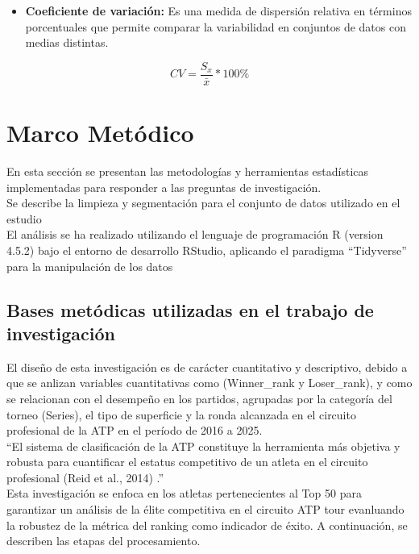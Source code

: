 \documentclass[oneside,11pt]{Latex/Classes/PhDthesisPSnPDF}
\begin{document}
\begin{itemize}
 \item \textbf{ Coeficiente de variación:} Es una medida de dispersión relativa en términos porcentuales que permite comparar la variabilidad en conjuntos de datos con medias distintas. 
\end{itemize}

\[CV=\frac{S_x} {\bar{x}}*100\% \]

\chapter{Marco Metódico}

En esta sección se presentan las metodologías y herramientas
estadísticas implementadas para responder a las preguntas de
investigación.\\

Se describe la limpieza y segmentación para el conjunto de datos
utilizado en el estudio\\

El análisis se ha realizado utilizando el lenguaje de programación R
(version 4.5.2) bajo el entorno de desarrollo RStudio, aplicando el
paradigma ``Tidyverse'' para la manipulación de los datos\\

\section{Bases metódicas utilizadas en el trabajo de investigación}

El diseño de esta investigación es de carácter cuantitativo y
descriptivo, debido a que se anlizan variables cuantitativas como
(Winner\_rank y Loser\_rank), y como se relacionan con el desempeño en
los partidos, agrupadas por la categoría del torneo (Series), el tipo de
superficie y la ronda alcanzada en el circuito profesional de la ATP en
el período de 2016 a 2025.\\

``El sistema de clasificación de la ATP constituye la herramienta más
objetiva y robusta para cuantificar el estatus competitivo de un atleta
en el circuito profesional (Reid et al., 2014) .''\\

Esta investigación se enfoca en los atletas pertenecientes al Top 50
para garantizar un análisis de la élite competitiva en el circuito ATP
tour evanluando la robustez de la métrica del ranking como indicador de
éxito. A continuación, se describen las etapas del procesamiento.\\
\end{document}
